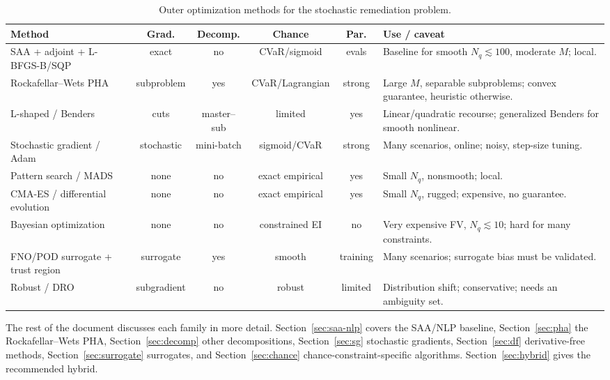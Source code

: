 \documentclass[11pt]{article}
\numberwithin{equation}{section}
\newcommand{\tabhead}[1]{\textbf{#1}}
\theoremstyle{plain}
\begin{document}
\begin{table}[htbp]
\centering
\scriptsize
\setlength{\tabcolsep}{3pt}
\begin{tabularx}{\textwidth}{@{}>{\raggedright\arraybackslash}p{2.9cm}cccc>{\raggedright\arraybackslash}X@{}}
\toprule
\tabhead{Method} & \tabhead{Grad.} & \tabhead{Decomp.} &
\tabhead{Chance} & \tabhead{Par.} & \tabhead{Use / caveat}\\
\midrule
SAA + adjoint + L-BFGS-B/SQP & exact & no & CVaR/sigmoid & evals & Baseline for
smooth $N_q\lesssim100$, moderate $M$; local.\\
Rockafellar--Wets PHA & subproblem & yes & CVaR/Lagrangian & strong & Large
$M$, separable subproblems; convex guarantee, heuristic otherwise.\\
L-shaped / Benders & cuts & master--sub & limited & yes & Linear/quadratic
recourse; generalized Benders for smooth nonlinear.\\
Stochastic gradient / Adam & stochastic & mini-batch & sigmoid/CVaR & strong &
Many scenarios, online; noisy, step-size tuning.\\
Pattern search / MADS & none & no & exact empirical & yes & Small $N_q$,
nonsmooth; local.\\
CMA-ES / differential evolution & none & no & exact empirical & yes & Small
$N_q$, rugged; expensive, no guarantee.\\
Bayesian optimization & none & no & constrained EI & no & Very expensive FV,
$N_q\lesssim10$; hard for many constraints.\\
FNO/POD surrogate + trust region & surrogate & yes & smooth & training &
Many scenarios; surrogate bias must be validated.\\
Robust / DRO & subgradient & no & robust & limited & Distribution shift;
conservative; needs an ambiguity set.\\
\bottomrule
\end{tabularx}
\caption{Outer optimization methods for the stochastic remediation problem.}
\label{tab:methods}
\end{table}

The rest of the document discusses each family in more detail.  Section~\ref{sec:saa-nlp}
covers the SAA/NLP baseline, Section~\ref{sec:pha} the Rockafellar--Wets PHA,
Section~\ref{sec:decomp} other decompositions, Section~\ref{sec:sg} stochastic
gradients, Section~\ref{sec:df} derivative-free methods, Section~\ref{sec:surrogate}
surrogates, and Section~\ref{sec:chance} chance-constraint-specific algorithms.
Section~\ref{sec:hybrid} gives the recommended hybrid.
\end{document}
